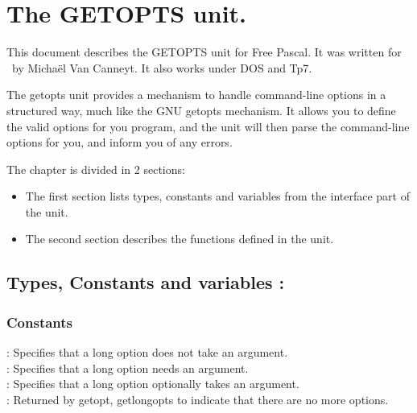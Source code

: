 %
%
%
%
%
\chapter{The GETOPTS unit.}
This document describes the GETOPTS unit for Free Pascal. It was written for
\linux\ by Micha\"el Van Canneyt. It also works under DOS and Tp7.

The getopts unit provides a mechanism to handle command-line options in
a structured way, much like the GNU getopts mechanism. It allows you to
define the valid options for you program, and the unit will then parse the
command-line options for you, and inform you of any errors.

The chapter is divided in 2 sections:
\begin{itemize}
\item The first section lists types, constants and variables from the
interface part of the unit.
\item The second section describes the functions defined in the unit.
\end{itemize}
\section {Types, Constants and variables : }
\subsection{Constants}
 : Specifies that a long option does not take an
argument. \\
 : Specifies that a long option needs an
argument. \\
 : Specifies that a long option optionally takes an
argument. \\
  : Returned by getopt, getlongopts to indicate that
there are no more options.
